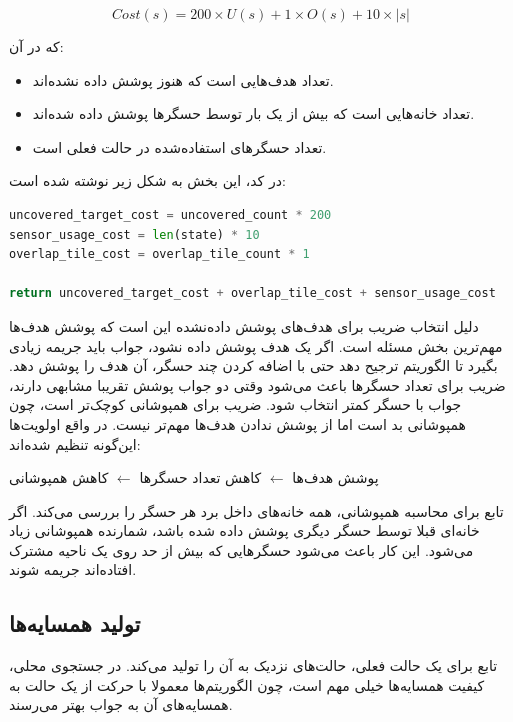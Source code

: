 \documentclass[10.5pt]{exam}
\begin{document}
\[
    Cost(s) =
    200 \times U(s) + 1 \times O(s) + 10 \times |s|
\]

که در آن:

\begin{itemize}
    \item {} تعداد هدف‌هایی است که هنوز پوشش داده نشده‌اند.
    \item {} تعداد خانه‌هایی است که بیش از یک بار توسط حسگرها پوشش داده شده‌اند.
    \item {} تعداد حسگرهای استفاده‌شده در حالت فعلی است.
\end{itemize}

در کد، این بخش به شکل زیر نوشته شده است:

\begin{latin}
\begin{lstlisting}[language=Python]
uncovered_target_cost = uncovered_count * 200
sensor_usage_cost = len(state) * 10
overlap_tile_cost = overlap_tile_count * 1

return uncovered_target_cost + overlap_tile_cost + sensor_usage_cost
\end{lstlisting}
\end{latin}

دلیل انتخاب ضریب
برای هدف‌های پوشش داده‌نشده این است که پوشش هدف‌ها مهم‌ترین بخش مسئله است. اگر یک هدف پوشش داده نشود، جواب باید جریمه زیادی بگیرد تا الگوریتم ترجیح دهد حتی با اضافه کردن چند حسگر، آن هدف را پوشش دهد. ضریب
برای تعداد حسگرها باعث می‌شود وقتی دو جواب پوشش تقریبا مشابهی دارند، جواب با حسگر کمتر انتخاب شود. ضریب
برای همپوشانی کوچک‌تر است، چون همپوشانی بد است اما از پوشش ندادن هدف‌ها مهم‌تر نیست. در واقع اولویت‌ها این‌گونه تنظیم شده‌اند:

\begin{center}
پوشش هدف‌ها \(\leftarrow\) کاهش تعداد حسگرها \(\leftarrow\) کاهش همپوشانی
\end{center}

تابع
برای محاسبه همپوشانی، همه خانه‌های داخل برد هر حسگر را بررسی می‌کند. اگر خانه‌ای قبلا توسط حسگر دیگری پوشش داده شده باشد، شمارنده همپوشانی زیاد می‌شود. این کار باعث می‌شود حسگرهایی که بیش از حد روی یک ناحیه مشترک افتاده‌اند جریمه شوند.

\subsection{تولید همسایه‌ها}
تابع
برای یک حالت فعلی، حالت‌های نزدیک به آن را تولید می‌کند. در جستجوی محلی، کیفیت همسایه‌ها خیلی مهم است، چون الگوریتم‌ها معمولا با حرکت از یک حالت به همسایه‌های آن به جواب بهتر می‌رسند.
\end{document}
